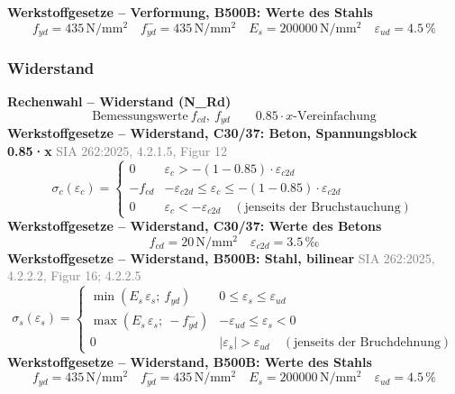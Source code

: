 \documentclass[11pt,a4paper]{article}
\newcommand{\normref}[1]{{\small\textcolor{gray}{#1}}}
\begin{document}
\noindent\textbf{Werkstoffgesetze – Verformung, B500B: Werte des Stahls}
\begin{equation*}
f_{yd} = 435\,\mathrm{N}/\mathrm{mm}^{2} \quad f_{yd}^{-} = 435\,\mathrm{N}/\mathrm{mm}^{2} \quad E_s = 200000\,\mathrm{N}/\mathrm{mm}^{2} \quad \varepsilon_{ud} = 4.5\,\%
\end{equation*}
\subsubsection{Widerstand}
\noindent\textbf{Rechenwahl – Widerstand (N\_Rd)}
\begin{equation*}
\text{Bemessungswerte}\ f_{cd},\ f_{yd} \qquad 0.85 \cdot x\text{-Vereinfachung}
\end{equation*}
\noindent\textbf{Werkstoffgesetze – Widerstand, C30/37: Beton, Spannungsblock 0.85·x} \hfill \normref{SIA 262:2025, 4.2.1.5, Figur 12}
\begin{equation*}
\sigma_c(\varepsilon_c) = \begin{cases} 0 & \varepsilon_c > -(1 - 0.85) \cdot \varepsilon_{c2d} \\[1ex] -f_{cd} & -\varepsilon_{c2d} \le \varepsilon_c \le -(1 - 0.85) \cdot \varepsilon_{c2d} \\[1ex] 0 & \varepsilon_c < -\varepsilon_{c2d} \quad (\text{jenseits der Bruchstauchung}) \end{cases}
\end{equation*}
\noindent\textbf{Werkstoffgesetze – Widerstand, C30/37: Werte des Betons}
\begin{equation*}
f_{cd} = 20\,\mathrm{N}/\mathrm{mm}^{2} \quad \varepsilon_{c2d} = 3.5\,\text{‰}
\end{equation*}
\noindent\textbf{Werkstoffgesetze – Widerstand, B500B: Stahl, bilinear} \hfill \normref{SIA 262:2025, 4.2.2.2, Figur 16; 4.2.2.5}
\begin{equation*}
\sigma_s(\varepsilon_s) = \begin{cases} \min(E_s\,\varepsilon_s;\ f_{yd}) & 0 \le \varepsilon_s \le \varepsilon_{ud} \\[1ex] \max(E_s\,\varepsilon_s;\ -f_{yd}^{-}) & -\varepsilon_{ud} \le \varepsilon_s < 0 \\[1ex] 0 & |\varepsilon_s| > \varepsilon_{ud} \quad (\text{jenseits der Bruchdehnung}) \end{cases}
\end{equation*}
\noindent\textbf{Werkstoffgesetze – Widerstand, B500B: Werte des Stahls}
\begin{equation*}
f_{yd} = 435\,\mathrm{N}/\mathrm{mm}^{2} \quad f_{yd}^{-} = 435\,\mathrm{N}/\mathrm{mm}^{2} \quad E_s = 200000\,\mathrm{N}/\mathrm{mm}^{2} \quad \varepsilon_{ud} = 4.5\,\%
\end{equation*}
\end{document}
